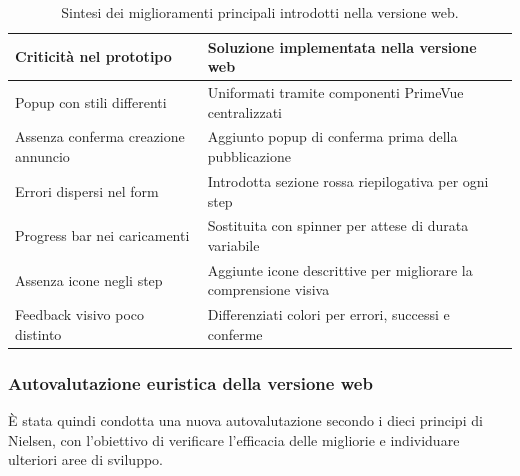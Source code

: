 \begin{table}[H]
\centering
\setlength{\tabcolsep}{6pt}
\renewcommand{\arraystretch}{1.2}
\begin{tabular}{p{5cm} p{10cm}}
\hline
\textbf{Criticità nel prototipo} & \textbf{Soluzione implementata nella versione web} \\
\hline
Popup con stili differenti & Uniformati tramite componenti PrimeVue centralizzati \\
Assenza conferma creazione annuncio & Aggiunto popup di conferma prima della pubblicazione \\
Errori dispersi nel form & Introdotta sezione rossa riepilogativa per ogni step \\
Progress bar nei caricamenti & Sostituita con spinner per attese di durata variabile \\
Assenza icone negli step & Aggiunte icone descrittive per migliorare la comprensione visiva \\
Feedback visivo poco distinto & Differenziati colori per errori, successi e conferme \\
\hline
\end{tabular}
\caption{Sintesi dei miglioramenti principali introdotti nella versione web.}
\end{table}

\subsubsection*{Autovalutazione euristica della versione web}

È stata quindi condotta una nuova autovalutazione secondo i dieci principi di Nielsen, con l’obiettivo di verificare l’efficacia delle migliorie e individuare ulteriori aree di sviluppo.

